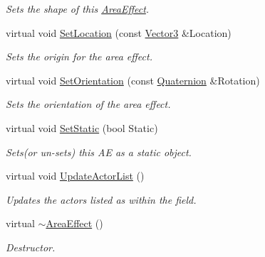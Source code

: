 \begin{DoxyCompactItemize}
\begin{DoxyCompactList}\small\item\em Sets the shape of this \hyperlink{classMezzanine_1_1AreaEffect}{AreaEffect}. \item\end{DoxyCompactList}\item 
virtual void \hyperlink{classMezzanine_1_1AreaEffect_a4dd22757bc627242de169e31a1717139}{SetLocation} (const \hyperlink{classMezzanine_1_1Vector3}{Vector3} \&Location)
\begin{DoxyCompactList}\small\item\em Sets the origin for the area effect. \item\end{DoxyCompactList}\item 
virtual void \hyperlink{classMezzanine_1_1AreaEffect_a62bcda0a0c2a95b8f1ccdfe2cd3d1018}{SetOrientation} (const \hyperlink{classMezzanine_1_1Quaternion}{Quaternion} \&Rotation)
\begin{DoxyCompactList}\small\item\em Sets the orientation of the area effect. \item\end{DoxyCompactList}\item 
virtual void \hyperlink{classMezzanine_1_1AreaEffect_adfecf112bad175a57cdf147cb0d0aaa8}{SetStatic} (bool Static)
\begin{DoxyCompactList}\small\item\em Sets(or un-\/sets) this AE as a static object. \item\end{DoxyCompactList}\item 
virtual void \hyperlink{classMezzanine_1_1AreaEffect_aee19befcb794b85f13da4e427c2be42d}{UpdateActorList} ()
\begin{DoxyCompactList}\small\item\em Updates the actors listed as within the field. \item\end{DoxyCompactList}\item 
virtual \hyperlink{classMezzanine_1_1AreaEffect_a1e825ce1dcb2d78c190b17d7bff7306c}{$\sim$AreaEffect} ()
\begin{DoxyCompactList}\small\item\em Destructor. \item\end{DoxyCompactList}\end{DoxyCompactItemize}
